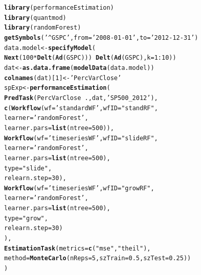 \documentclass[10pt,a4paper]{article}\usepackage[]{graphicx}\usepackage[]{color}
\makeatletter
\newcommand{\hlnum}[1]{\textcolor[rgb]{0.686,0.059,0.569}{#1}}%
\newcommand{\hlstr}[1]{\textcolor[rgb]{0.192,0.494,0.8}{#1}}%
\newcommand{\hlopt}[1]{\textcolor[rgb]{0,0,0}{#1}}%
\newcommand{\hlstd}[1]{\textcolor[rgb]{0.345,0.345,0.345}{#1}}%
\newcommand{\hlkwb}[1]{\textcolor[rgb]{0.69,0.353,0.396}{#1}}%
\newcommand{\hlkwc}[1]{\textcolor[rgb]{0.333,0.667,0.333}{#1}}%
\newcommand{\hlkwd}[1]{\textcolor[rgb]{0.737,0.353,0.396}{\textbf{#1}}}%
\newenvironment{kframe}{%
 \def\at@end@of@kframe{}%
 \ifinner\ifhmode%
  \def\at@end@of@kframe{\end{minipage}}%
  \begin{minipage}{\columnwidth}%
 \fi\fi%
 \def\FrameCommand##1{\hskip\@totalleftmargin \hskip-\fboxsep
 \colorbox{shadecolor}{##1}\hskip-\fboxsep
     \hskip-\linewidth \hskip-\@totalleftmargin \hskip\columnwidth}%
 \MakeFramed {\advance\hsize-\width
   \@totalleftmargin\z@ \linewidth\hsize
   \@setminipage}}%
 {\par\unskip\endMakeFramed%
 \at@end@of@kframe}
\newenvironment{knitrout}{}{} %
\makeatother
\begin{document}
\begin{knitrout}\footnotesize
{}\color{fgcolor}\begin{kframe}
\begin{alltt}
\hlkwd{library}\hlstd{(performanceEstimation)}
\hlkwd{library}\hlstd{(quantmod)}
\hlkwd{library}\hlstd{(randomForest)}
\hlkwd{getSymbols}\hlstd{(}\hlstr{'^GSPC'}\hlstd{,}\hlkwc{from}\hlstd{=}\hlstr{'2008-01-01'}\hlstd{,}\hlkwc{to}\hlstd{=}\hlstr{'2012-12-31'}\hlstd{)}
\hlstd{data.model} \hlkwb{<-} \hlkwd{specifyModel}\hlstd{(}
  \hlkwd{Next}\hlstd{(}\hlnum{100}\hlopt{*}\hlkwd{Delt}\hlstd{(}\hlkwd{Ad}\hlstd{(GSPC)))} \hlopt{~} \hlkwd{Delt}\hlstd{(}\hlkwd{Ad}\hlstd{(GSPC),}\hlkwc{k}\hlstd{=}\hlnum{1}\hlopt{:}\hlnum{10}\hlstd{))}
\hlstd{dat} \hlkwb{<-} \hlkwd{as.data.frame}\hlstd{(}\hlkwd{modelData}\hlstd{(data.model))}
\hlkwd{colnames}\hlstd{(dat)[}\hlnum{1}\hlstd{]} \hlkwb{<-} \hlstr{'PercVarClose'}
\hlstd{spExp} \hlkwb{<-} \hlkwd{performanceEstimation}\hlstd{(}
  \hlkwd{PredTask}\hlstd{(PercVarClose} \hlopt{~} \hlstd{.,dat,}\hlstr{'SP500_2012'}\hlstd{),}
  \hlkwd{c}\hlstd{(}\hlkwd{Workflow}\hlstd{(}\hlkwc{wf}\hlstd{=}\hlstr{'standardWF'}\hlstd{,}\hlkwc{wfID}\hlstd{=}\hlstr{"standRF"}\hlstd{,}
             \hlkwc{learner}\hlstd{=}\hlstr{'randomForest'}\hlstd{,}
             \hlkwc{learner.pars}\hlstd{=}\hlkwd{list}\hlstd{(}\hlkwc{ntree}\hlstd{=}\hlnum{500}\hlstd{)),}
    \hlkwd{Workflow}\hlstd{(}\hlkwc{wf}\hlstd{=}\hlstr{'timeseriesWF'}\hlstd{,}\hlkwc{wfID}\hlstd{=}\hlstr{"slideRF"}\hlstd{,}
             \hlkwc{learner}\hlstd{=}\hlstr{'randomForest'}\hlstd{,}
             \hlkwc{learner.pars}\hlstd{=}\hlkwd{list}\hlstd{(}\hlkwc{ntree}\hlstd{=}\hlnum{500}\hlstd{),}
             \hlkwc{type}\hlstd{=}\hlstr{"slide"}\hlstd{,}
             \hlkwc{relearn.step}\hlstd{=}\hlnum{30}\hlstd{),}
    \hlkwd{Workflow}\hlstd{(}\hlkwc{wf}\hlstd{=}\hlstr{'timeseriesWF'}\hlstd{,}\hlkwc{wfID}\hlstd{=}\hlstr{"growRF"}\hlstd{,}
             \hlkwc{learner}\hlstd{=}\hlstr{'randomForest'}\hlstd{,}
             \hlkwc{learner.pars}\hlstd{=}\hlkwd{list}\hlstd{(}\hlkwc{ntree}\hlstd{=}\hlnum{500}\hlstd{),}
             \hlkwc{type}\hlstd{=}\hlstr{"grow"}\hlstd{,}
             \hlkwc{relearn.step}\hlstd{=}\hlnum{30}\hlstd{)}
   \hlstd{),}
  \hlkwd{EstimationTask}\hlstd{(}\hlkwc{metrics}\hlstd{=}\hlkwd{c}\hlstd{(}\hlstr{"mse"}\hlstd{,}\hlstr{"theil"}\hlstd{),}
                 \hlkwc{method}\hlstd{=}\hlkwd{MonteCarlo}\hlstd{(}\hlkwc{nReps}\hlstd{=}\hlnum{5}\hlstd{,}\hlkwc{szTrain}\hlstd{=}\hlnum{0.5}\hlstd{,}\hlkwc{szTest}\hlstd{=}\hlnum{0.25}\hlstd{))}
  \hlstd{)}
\end{alltt}
\end{kframe}
\end{knitrout}
\end{document}
